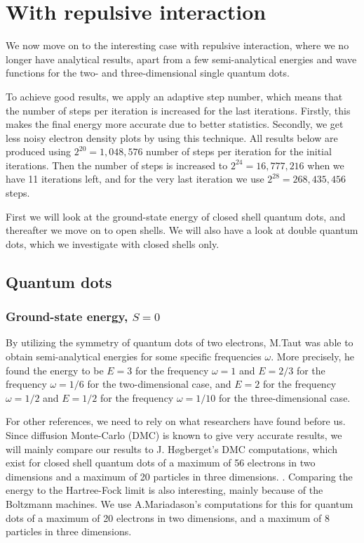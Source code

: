 \section{With repulsive interaction}
We now move on to the interesting case with repulsive interaction, where we no longer have analytical results, apart from a few semi-analytical energies and wave functions  for the two- and three-dimensional single quantum dots.

To achieve good results, we apply an adaptive step number, which means that the number of steps per iteration is increased for the last iterations. Firstly, this makes the final energy more accurate due to better statistics. Secondly, we get less noisy electron density plots by using this technique. All results below are produced using $2^{20}=1,048,576$ number of steps per iteration for the initial iterations. Then the number of steps is increased to $2^{24}=16,777,216$ when we have 11 iterations left, and for the very last iteration we use $2^{28}=268,435,456$ steps.

First we will look at the ground-state energy of closed shell quantum dots, and thereafter we move on to open shells. We will also have a look at double quantum dots, which we investigate with closed shells only.

\subsection{Quantum dots}
\subsubsection{Ground-state energy, $S=0$}
By utilizing the symmetry of quantum dots of two electrons, M.Taut was able to obtain semi-analytical energies for some specific frequencies $\omega$. More precisely, he found the energy to be $E=3$ for the frequency $\omega=1$ and $E=2/3$ for the frequency $\omega=1/6$ for the two-dimensional case, and $E=2$ for the frequency $\omega=1/2$ and $E=1/2$ for the frequency $\omega=1/10$ for the three-dimensional case. \cite{taut_two_1993}\cite{taut_two_1994}

For other references, we need to rely on what researchers have found before us. Since diffusion Monte-Carlo (DMC) is known to give very accurate results, we will mainly compare our results to J. Høgberget's DMC computations, which exist for closed shell quantum dots of a maximum of 56 electrons in two dimensions and a maximum of 20 particles in three dimensions. \cite{hogberget_quantum_2013}. Comparing the energy to the Hartree-Fock limit is also interesting, mainly because of the Boltzmann machines. We use A.Mariadason's computations for this for quantum dots of a maximum of 20 electrons in two dimensions, and a maximum of 8 particles in three dimensions. \cite{mariadason_quantum_2018}

